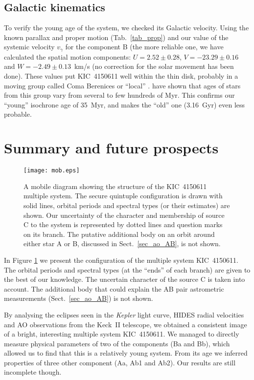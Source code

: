 \documentclass{aa}
\newcommand{\kep}{{\it Kepler }}
\begin{document}
\subsection{Galactic kinematics}
To verify the young age of the system, we checked its Galactic velocity. 
Using the known parallax and proper motion (Tab.~\ref{tab_prop}) and our 
value of the systemic velocity $v_\gamma$ for the component B (the more 
reliable one, we have calculated the spatial motion components: $U=2.52\pm0.28$, 
$V=-23.29\pm0.16$ and $W=-2.49\pm0.13$~km/s (no correction for the solar movement  
has been done). These values put KIC~4150611 well within the thin disk, probably in 
a moving group called Coma Berenices or ``local'' \citep{nor04,fam05,sea07}.
\citet{fam05} have shown that ages of stars from this group vary from several
to few hundreds of Myr. This confirms our ``young'' isochrone age of 35~Myr, and
makes the ``old'' one (3.16~Gyr) even less probable.



\section{Summary and future prospects}

\begin{figure}
\centering
\texttt{[image: mob.eps]}
\caption{A mobile diagram showing the structure of the KIC~4150611 multiple
system. The secure quintuple configuration is drawn with solid lines, orbital periods
and spectral types (or their estimates) are shown. Our uncertainty of the character
and membership of source C to the system is represented by dotted lines and question 
marks on its branch. The putative additional body on an orbit around either star
A or B, discussed in Sect.~\ref{sec_ao_AB}, is not shown.}\label{fig_mob}
\end{figure}

In Figure \ref{fig_mob} we present the configuration of the multiple system
KIC~4150611. The orbital periods and spectral types (at the ``ends'' of each branch)
are given to the best of our knowledge. The uncertain character of the source C is
taken into account. The additional body that could explain the AB pair astrometric 
measurements (Sect.~\ref{sec_ao_AB}) is not shown.

By analysing the eclipses seen in the \kep light curve, HIDES radial velocities
and AO observations from the Keck~II telescope, we obtained a consistent image of a
bright, interesting multiple system KIC~4150611. We managed to directly measure
physical parameters of two of the components (Ba and Bb), which allowed us to find that
this is a relatively young system. From its age we inferred properties of three 
other component (Aa, Ab1 and Ab2). Our results are still incomplete though.
\end{document}
